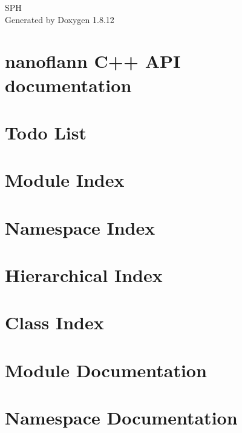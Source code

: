 \documentclass[twoside]{book}
\newcommand{\+}{\discretionary{\mbox{\scriptsize$\hookleftarrow$}}{}{}}
\newcommand{\clearemptydoublepage}{%
  \newpage{\pagestyle{empty}\cleardoublepage}%
}
\begin{document}
\hypersetup{pageanchor=false,
             bookmarksnumbered=true,
             pdfencoding=unicode
            }
\begin{titlepage}
\vspace*{7cm}
\begin{center}%
{\Large S\+PH }\\
\vspace*{1cm}
{\large Generated by Doxygen 1.8.12}\\
\end{center}
\end{titlepage}
\clearemptydoublepage
{}
\tableofcontents
\clearemptydoublepage
{}
\hypersetup{pageanchor=true}

\chapter{nanoflann C++ A\+PI documentation}
\label{index}\hypertarget{index}{}
\chapter{Todo List}
\label{todo}
\hypertarget{todo}{}

\chapter{Module Index}

\chapter{Namespace Index}

\chapter{Hierarchical Index}

\chapter{Class Index}

\chapter{Module Documentation}








\chapter{Namespace Documentation}

\end{document}
